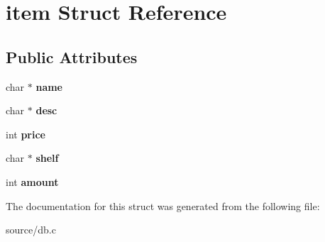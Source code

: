 \hypertarget{structitem}{}\section{item Struct Reference}
\label{structitem}
\subsection*{Public Attributes}
\begin{DoxyCompactItemize}
\item 
char $\ast$ {\bfseries name}\hypertarget{structitem_adbf6cb817816601a08c614bb77bcf075}{}\label{structitem_adbf6cb817816601a08c614bb77bcf075}

\item 
char $\ast$ {\bfseries desc}\hypertarget{structitem_a374518ff217e649d5e80f5f59fd1a4ba}{}\label{structitem_a374518ff217e649d5e80f5f59fd1a4ba}

\item 
int {\bfseries price}\hypertarget{structitem_a77214da8535815143a7ba318a25c5811}{}\label{structitem_a77214da8535815143a7ba318a25c5811}

\item 
char $\ast$ {\bfseries shelf}\hypertarget{structitem_a87c5aef7e64085cc30f95f776e52bc35}{}\label{structitem_a87c5aef7e64085cc30f95f776e52bc35}

\item 
int {\bfseries amount}\hypertarget{structitem_a6604e6749c05034840efd41242ba411a}{}\label{structitem_a6604e6749c05034840efd41242ba411a}

\end{DoxyCompactItemize}


The documentation for this struct was generated from the following file\+:\begin{DoxyCompactItemize}
\item 
source/db.\+c\end{DoxyCompactItemize}
